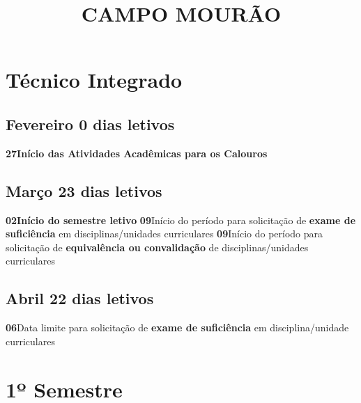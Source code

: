 \documentclass[thesis]{hmcposter}
\author{ }
\title{CAMPO MOURÃO}
\begin{document}
\begin{poster}
\normalsize\section{\color{hmcorange}Técnico Integrado}\subsection{Fevereiro \hfill 0 dias letivos}\textbf{27}\qquad \textbf{Início das Atividades Acadêmicas para os Calouros} \newline \null\subsection{Março \hfill 23 dias letivos}\textbf{02}\qquad \textbf{Início do semestre letivo} \newline \null\textbf{09}\qquad Início do período para solicitação de \textbf{exame de suficiência} em disciplinas/unidades curriculares \newline \null\textbf{09}\qquad Início do período para solicitação de \textbf{equivalência ou convalidação} de disciplinas/unidades curriculares \newline \null\subsection{Abril \hfill 22 dias letivos}\textbf{06}\qquad Data limite para solicitação de \textbf{exame de suficiência} em disciplina/unidade curriculares \newline \null\vfill\null
\columnbreak
\section{\hfill \color{hmcorange}1º Semestre}

\end{poster}
\end{document}
